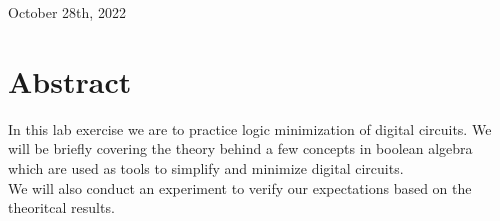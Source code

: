 \documentclass{article}
\begin{document}
\begin{titlepage}
    
    
    \vfill\vfill\vfill %
    
    {\large October 28th, 2022} %
    
    
     
    
    \vfill %
    
  \end{titlepage}


\pagebreak

\section*{Abstract}
In this lab exercise we are to practice logic minimization of digital circuits. We will be briefly covering the theory behind
a few concepts in boolean algebra which are used as tools to simplify and minimize digital circuits.\\
We will also conduct an experiment to verify our expectations based on the theoritcal results.

\vspace{11cm}
\tableofcontents
\pagebreak
 \addtocounter{section}{1}
\end{document}
